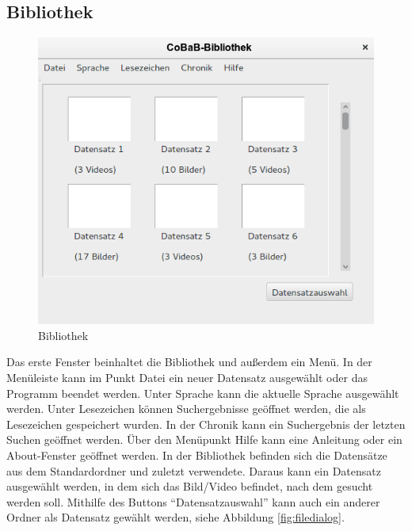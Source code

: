 \subsection{Bibliothek}
\begin{figure}[H]
\includegraphics[width=1\linewidth]{img/Bibliothek2}
\caption{Bibliothek}
\label{fig:bibliothek}
\end{figure}
Das erste Fenster beinhaltet die Bibliothek und außerdem ein Menü. In der Menüleiste kann im Punkt Datei ein neuer Datensatz ausgewählt oder das Programm beendet werden.  Unter Sprache kann die aktuelle Sprache ausgewählt werden. Unter \gls{Lesezeichen} können Suchergebnisse geöffnet werden, die als \gls{Lesezeichen} gespeichert wurden. In der Chronik kann ein Suchergebnis der letzten Suchen geöffnet werden. Über den Menüpunkt Hilfe kann eine Anleitung oder ein About-Fenster geöffnet werden.
In der Bibliothek befinden sich die Datensätze aus dem Standardordner und zuletzt verwendete. Daraus kann ein Datensatz ausgewählt werden, in dem sich das Bild/Video befindet, nach dem gesucht werden soll. Mithilfe des Buttons \enquote{Datensatzauswahl} kann auch ein anderer Ordner als Datensatz gewählt werden, siehe Abbildung \ref{fig:filedialog}.

